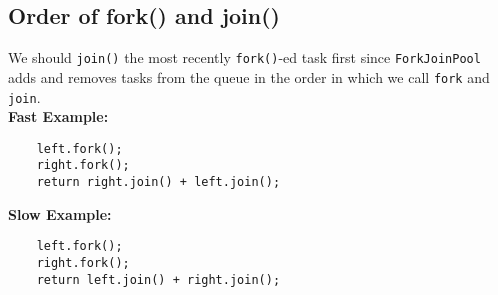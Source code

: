 \documentclass[10pt,landscape,a4paper]{article}
\begin{document}
\begin{multicols*}{4}
\subsection{Order of fork() and join()}
We should \texttt{join()} the most recently \texttt{fork()}-ed task first since \texttt{ForkJoinPool} adds and removes tasks from the queue in the order in which we call \texttt{fork} and \texttt{join}. \\
\textbf{Fast Example:}
\begin{lstlisting}
    left.fork();
    right.fork();
    return right.join() + left.join();
\end{lstlisting}
\textbf{Slow Example:}
\begin{lstlisting}
    left.fork();
    right.fork();
    return left.join() + right.join();
\end{lstlisting}




\end{multicols*}
\end{document}
